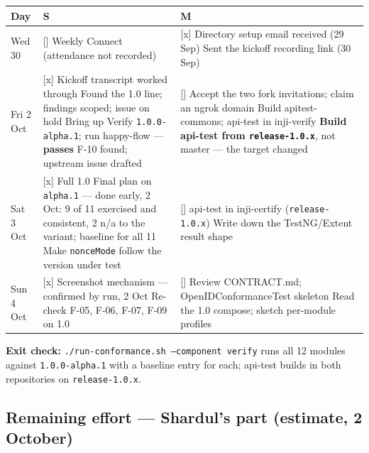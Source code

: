 \documentclass[10pt,a4paper]{article}
\newcommand{\done}{[x]}
\newcommand{\todo}{[\phantom{x}]}
\newcommand{\Sh}{\textbf{S}}
\newcommand{\Mu}{\textbf{M}}
\begin{document}
\begin{longtable}{@{}p{1.9cm}p{6.9cm}p{7.2cm}@{}}
\toprule
Day & \Sh & \Mu\\
\midrule
\endhead
Wed 30 & \todo{} Weekly Connect (attendance not recorded)
& \done{} Directory setup email received (29 Sep)\newline
\done{} Sent the kickoff recording link (30 Sep)\\
\addlinespace
Fri 2 Oct & \done{} Kickoff transcript worked through\newline
\done{} Found the 1.0 line; findings scoped; issue on hold\newline
\done{} Bring up Verify \texttt{1.0.0-alpha.1}; run happy-flow --- \textbf{passes}\newline
\done{} F-10 found; upstream issue drafted
& \todo{} Accept the two fork invitations; claim an ngrok domain\newline
\todo{} Build apitest-commons; api-test in inji-verify\newline
\textbf{Build api-test from \texttt{release-1.0.x}}, not master --- the target changed\\
\addlinespace
Sat 3 Oct & \done{} Full 1.0 Final plan on \texttt{alpha.1} --- done early, 2 Oct: 9 of 11
exercised and consistent, 2 n/a to the variant; baseline for all 11\newline
\todo{} Make \texttt{nonceMode} follow the version under test
& \todo{} api-test in inji-certify (\texttt{release-1.0.x})\newline
\todo{} Write down the TestNG/Extent result shape\\
\addlinespace
Sun 4 Oct & \done{} Screenshot mechanism --- confirmed by run, 2 Oct\newline
\todo{} Re-check F-05, F-06, F-07, F-09 on 1.0
& \todo{} Review CONTRACT.md; OpenIDConformanceTest skeleton\newline
\todo{} Read the 1.0 compose; sketch per-module profiles\\
\bottomrule
\end{longtable}

\textbf{Exit check:} \texttt{./run-conformance.sh --component verify} runs all 12 modules
against \texttt{1.0.0-alpha.1} with a baseline entry for each; api-test builds in both
repositories on \texttt{release-1.0.x}.

\subsection{Remaining effort --- Shardul's part (estimate, 2 October)}
\end{document}

